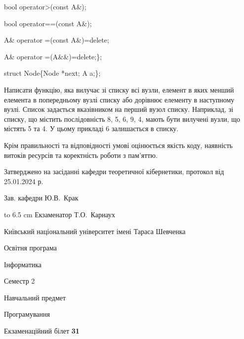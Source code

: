 \documentclass[12pt, ukrainian]{article}
\begin{document}
{\quad  bool operator>(const A\&); 

\quad  bool operator==(const A\&); 

\quad A\& operator =(const A\&)=delete; 

\quad  A\& operator =(A\&\&)=delete;\};

struct Node\{Node *next; A a;\};

 Написати функцію, яка вилучає зі списку всі вузли, елемент в яких менший елемента в попередньому вузлі списку або дорівнює елементу в наступному вузлі. Список задається вказівником на перший вузол списку. Наприклад, зі списку, що містить послідовність 8, 5, 6, 9, 4, мають бути вилучені вузли, що містять 5 та 4. У цьому прикладі 6 залишається в списку.

Крім правильності та відповідності умові оцінюється якість коду, наявність витоків ресурсів та коректність роботи з пам'яттю. 

}
{\smallskip\smallskip \begin {scriptsize} Затверджено на засіданні кафедри теоретичної кібернетики, протокол   від   25.01.2024 р.\par\smallskip\smallskip\smallskip\smallskip
{\parbox {6.5 cm} {Зав. кафедри \dotfill Ю.В.~Крак}}\hspace {0.7cm} {\hbox to 6.5 cm { Екзаменатор \dotfill Т.О.~Карнаух}} \end{scriptsize}}
\newpage
{{\begin {scriptsize}\par
{ \center  Київський національний університет імені Тараса Шевченка \par}
{\parbox {5 cm}{Освітня програма \hfill}{\parbox {7 cm}{Інформатика\hfill}}\parbox {6 cm}{\hfill Семестр 2}}\par
{\parbox {5 cm} {Навчальний предмет \hfill}\parbox {7 cm}{Програмування \hfill}\parbox {6cm}{\hfill}\par}\vspace{-15pt} \end{scriptsize}}{\center Екзаменаційний білет \No \textbf { 31 }\par}}
\end{document}
